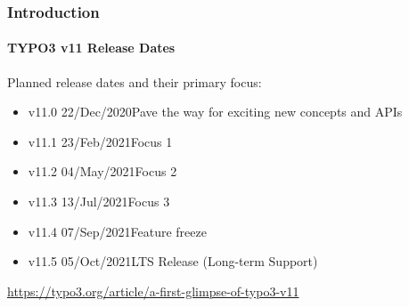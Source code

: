 
\begin{frame}[fragile]
	\frametitle{Introduction}
	\framesubtitle{TYPO3 v11 Release Dates}

	Planned release dates and their primary focus:

	\begin{itemize}
		\item
			\begingroup
				\color{typo3orange}
				v11.0 \tabto{1.1cm}22/Dec/2020\tabto{3.4cm}Pave the way for exciting new concepts and APIs
			\endgroup
		\item v11.1 \tabto{1.1cm}23/Feb/2021\tabto{3.4cm}Focus 1
		\item v11.2 \tabto{1.1cm}04/May/2021\tabto{3.4cm}Focus 2
		\item v11.3 \tabto{1.1cm}13/Jul/2021\tabto{3.4cm}Focus 3
		\item v11.4 \tabto{1.1cm}07/Sep/2021\tabto{3.4cm}Feature freeze
		\item v11.5 \tabto{1.1cm}05/Oct/2021\tabto{3.4cm}LTS Release (Long-term Support)

	\end{itemize}

	\smaller
		\url{https://typo3.org/article/a-first-glimpse-of-typo3-v11}
	\normalsize

\end{frame}

